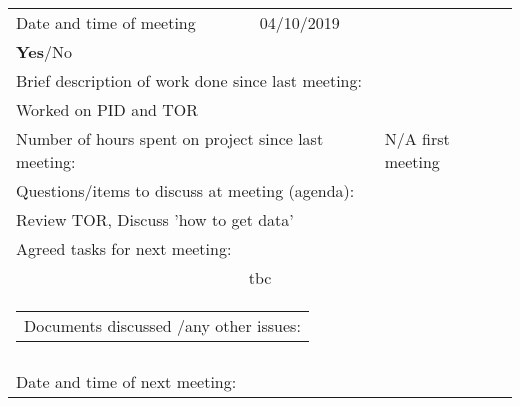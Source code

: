 
 \\
\smallskip
\\
\begin{tabularx}{\textwidth}{|X|X|X|}
     
\hline
Date and time of meeting                         &          04/10/2019               & \begin{tabular}[c]{@{}l@{}}As scheduled:  \\ \textbf{Yes}/No\end{tabular} \\ \hline
\multicolumn{3}{|l|}{Brief description of work done since last meeting:}                                                                      \\ \hline
\multicolumn{3}{|l|}{Worked on PID and TOR}                                                                                                                     \\ \hline
\multicolumn{2}{|l|}{Number of hours spent on project since last meeting:} & N/A first meeting                    \\ \hline
\multicolumn{3}{|l|}{Questions/items to discuss at meeting (agenda):}  \\ \hline 
\multicolumn{3}{|l|}{Review TOR, Discuss 'how to get data'}     \\ \hline
\multicolumn{3}{|l|}{Agreed tasks for next meeting:}                                                                                          \\ \hline
\multicolumn{3}{|c|}{tbc}                                                                                                                     \\ \hline
\multicolumn{3}{|l|}{\begin{tabular}[c]{@{}l@{}}Documents discussed /any other issues:\end{tabular}}                                        \\ \hline
\multicolumn{3}{|l|}{}                                                                                                                        \\ \hline
\multicolumn{2}{|l|}{Date and time of next meeting:}                       &                                                                  \\ \hline
\end{tabularx}
\\
\smallskip

